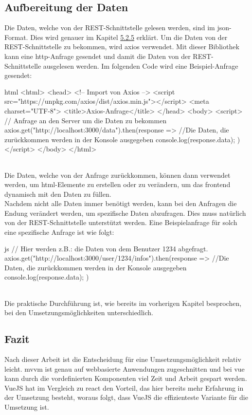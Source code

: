 \subsection{Aufbereitung der Daten}
Die Daten, welche von der REST-Schnittstelle gelesen werden, sind im \Gls{json}-Format. Dies wird genauer im Kapitel \hyperref[sec:json]{5.2.5} erklärt. Um die Daten von der REST-Schnittstelle zu bekommen, wird \Gls{axios} verwendet. Mit dieser Bibliothek kann eine \Gls{http}-Anfrage gesendet und damit die Daten von der REST-Schnittstelle ausgelesen werden. Im folgenden Code wird eine Beispiel-Anfrage gesendet:
\begin{code}{html}
	<html>
		<head>
			<!-- Import von Axios -->
			<script src="https://unpkg.com/axios/dist/axios.min.js"></script>
			<meta charset="UTF-8">
			<title>Axios-Anfrage</title>
		</head>
		<body>
			<script>
				// Anfrage an den Server um die Daten zu bekommen
				axios.get("http://localhost:3000/data").then(response => {
					//Die Daten, die zurückkommen werden in der Konsole ausgegeben
					console.log(response.data);
				})
			</script>
		</body>
	</html>
\end{code}
~\\
Die Daten, welche von der Anfrage zurückkommen, können dann verwendet werden, um \Gls{html}-Elemente zu erstellen oder zu verändern, um das \Gls{frontend} dynamisch mit den Daten zu füllen.\\Nachdem nicht alle Daten immer benötigt werden, kann bei den Anfragen die Endung verändert werden, um spezifische Daten abzufragen. Dies muss natürlich von der REST-Schnittstelle unterstützt werden. Eine Beispielanfrage für solch eine spezifische Anfrage ist wie folgt:
\begin{code}{js}
	// Hier werden z.B.: die Daten von dem Benutzer 1234 abgefragt.
	axios.get("http://localhost:3000/user/1234/infos").then(response => {
		//Die Daten, die zurückkommen werden in der Konsole ausgegeben
		console.log(response.data);
	})
\end{code}
~\\
Die praktische Durchführung ist, wie bereits im vorherigen Kapitel besprochen, bei den Umsetzungsmöglichkeiten unterschiedlich.

\subsection{Fazit}
\label{sec:rfoster_fazit}
Nach dieser Arbeit ist die Entscheidung für eine Umsetzungsmöglichkeit relativ leicht. \Gls{mvvm} ist genau auf webbasierte Anwendungen zugeschnitten und bei \Gls{vue} kann durch die vordefinierten Komponenten viel Zeit und Arbeit gespart werden. VueJS hat im Vergleich zu \Gls{react} den Vorteil, das hier bereits mehr Erfahrung in der Umsetzung besteht, woraus folgt, dass VueJS die effizienteste Variante für die Umsetzung ist.